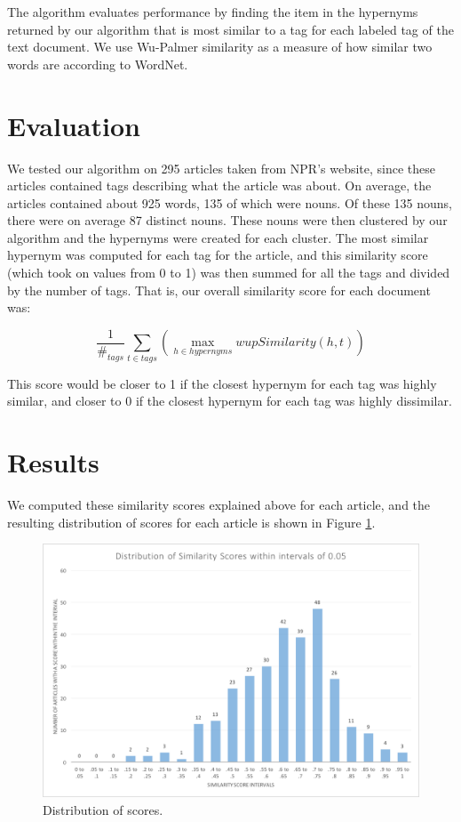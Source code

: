\documentclass[12pt]{article}
\begin{document}
The algorithm evaluates performance by finding the item in the hypernyms returned by our algorithm that is most similar to a tag for each labeled tag of the text document. We use Wu-Palmer similarity as a measure of how similar two words are according to WordNet.

\section{Evaluation}

We tested our algorithm on 295 articles taken from NPR's website, since these articles contained tags describing what the article was about. On average, the articles contained about 925 words, 135 of which were nouns. Of these 135 nouns, there were on average 87 distinct nouns. These nouns were then clustered by our algorithm and the hypernyms were created for each cluster. The most similar hypernym was computed for each tag for the article, and this similarity score (which took on values from 0 to 1) was then summed for all the tags and divided by the number of tags. That is, our overall similarity score for each document was:

\[
 \frac{1}{\#_{tags}} \sum_{t \in tags}{(\max_{h \in hypernyms}{wupSimilarity(h, t)})}
\]

This score would be closer to 1 if the closest hypernym for each tag was highly similar, and closer to 0 if the closest hypernym for each tag was highly dissimilar.

\section{Results}

We computed these similarity scores explained above for each article, and the resulting distribution of scores for each article is shown in Figure \ref{scoreHist}.

\begin{figure}[h]
\centering
\includegraphics[width=\textwidth]{../scoreHist.png}
\caption{Distribution of scores.}
\label{scoreHist}
\end{figure}
\end{document}
